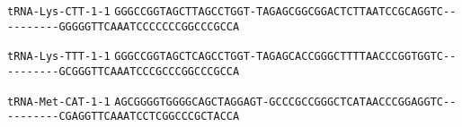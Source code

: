 \documentclass{article}
\newcommand{\rnabox}[1]{\colorbox{#1}{\texttt{#1}}}
\begin{document}
\vspace{-0.5mm}

\texttt{tRNA-Lys-CTT-1-1}
\rnabox{G}\rnabox{G}\rnabox{G}\rnabox{C}\rnabox{C}\rnabox{G}\rnabox{G}\rnabox{T}\rnabox{A}\rnabox{G}\rnabox{C}\rnabox{T}\rnabox{T}\rnabox{A}\rnabox{G}\rnabox{C}\rnabox{C}\rnabox{T}\rnabox{G}\rnabox{G}\rnabox{T}\rnabox{-}\rnabox{T}\rnabox{A}\rnabox{G}\rnabox{A}\rnabox{G}\rnabox{C}\rnabox{G}\rnabox{G}\rnabox{C}\rnabox{G}\rnabox{G}\rnabox{A}\rnabox{C}\rnabox{T}\rnabox{C}\rnabox{T}\rnabox{T}\rnabox{A}\rnabox{A}\rnabox{T}\rnabox{C}\rnabox{C}\rnabox{G}\rnabox{C}\rnabox{A}\rnabox{G}\rnabox{G}\rnabox{T}\rnabox{C}\rnabox{-}\rnabox{-}\rnabox{-}\rnabox{-}\rnabox{-}\rnabox{-}\rnabox{-}\rnabox{-}\rnabox{-}\rnabox{-}\rnabox{G}\rnabox{G}\rnabox{G}\rnabox{G}\rnabox{G}\rnabox{T}\rnabox{T}\rnabox{C}\rnabox{A}\rnabox{A}\rnabox{A}\rnabox{T}\rnabox{C}\rnabox{C}\rnabox{C}\rnabox{C}\rnabox{C}\rnabox{C}\rnabox{C}\rnabox{G}\rnabox{G}\rnabox{C}\rnabox{C}\rnabox{C}\rnabox{G}\rnabox{C}\rnabox{C}\rnabox{A}

\vspace{-0.5mm}

\texttt{tRNA-Lys-TTT-1-1}
\rnabox{G}\rnabox{G}\rnabox{G}\rnabox{C}\rnabox{C}\rnabox{G}\rnabox{G}\rnabox{T}\rnabox{A}\rnabox{G}\rnabox{C}\rnabox{T}\rnabox{C}\rnabox{A}\rnabox{G}\rnabox{C}\rnabox{C}\rnabox{T}\rnabox{G}\rnabox{G}\rnabox{T}\rnabox{-}\rnabox{T}\rnabox{A}\rnabox{G}\rnabox{A}\rnabox{G}\rnabox{C}\rnabox{A}\rnabox{C}\rnabox{C}\rnabox{G}\rnabox{G}\rnabox{G}\rnabox{C}\rnabox{T}\rnabox{T}\rnabox{T}\rnabox{T}\rnabox{A}\rnabox{A}\rnabox{C}\rnabox{C}\rnabox{C}\rnabox{G}\rnabox{G}\rnabox{T}\rnabox{G}\rnabox{G}\rnabox{T}\rnabox{C}\rnabox{-}\rnabox{-}\rnabox{-}\rnabox{-}\rnabox{-}\rnabox{-}\rnabox{-}\rnabox{-}\rnabox{-}\rnabox{-}\rnabox{G}\rnabox{C}\rnabox{G}\rnabox{G}\rnabox{G}\rnabox{T}\rnabox{T}\rnabox{C}\rnabox{A}\rnabox{A}\rnabox{A}\rnabox{T}\rnabox{C}\rnabox{C}\rnabox{C}\rnabox{G}\rnabox{C}\rnabox{C}\rnabox{C}\rnabox{G}\rnabox{G}\rnabox{C}\rnabox{C}\rnabox{C}\rnabox{G}\rnabox{C}\rnabox{C}\rnabox{A}

\vspace{-0.5mm}

\texttt{tRNA-Met-CAT-1-1}
\rnabox{A}\rnabox{G}\rnabox{C}\rnabox{G}\rnabox{G}\rnabox{G}\rnabox{G}\rnabox{T}\rnabox{G}\rnabox{G}\rnabox{G}\rnabox{G}\rnabox{C}\rnabox{A}\rnabox{G}\rnabox{C}\rnabox{T}\rnabox{A}\rnabox{G}\rnabox{G}\rnabox{A}\rnabox{G}\rnabox{T}\rnabox{-}\rnabox{G}\rnabox{C}\rnabox{C}\rnabox{C}\rnabox{G}\rnabox{C}\rnabox{C}\rnabox{G}\rnabox{G}\rnabox{G}\rnabox{C}\rnabox{T}\rnabox{C}\rnabox{A}\rnabox{T}\rnabox{A}\rnabox{A}\rnabox{C}\rnabox{C}\rnabox{C}\rnabox{G}\rnabox{G}\rnabox{A}\rnabox{G}\rnabox{G}\rnabox{T}\rnabox{C}\rnabox{-}\rnabox{-}\rnabox{-}\rnabox{-}\rnabox{-}\rnabox{-}\rnabox{-}\rnabox{-}\rnabox{-}\rnabox{-}\rnabox{C}\rnabox{G}\rnabox{A}\rnabox{G}\rnabox{G}\rnabox{T}\rnabox{T}\rnabox{C}\rnabox{A}\rnabox{A}\rnabox{A}\rnabox{T}\rnabox{C}\rnabox{C}\rnabox{T}\rnabox{C}\rnabox{G}\rnabox{G}\rnabox{C}\rnabox{C}\rnabox{C}\rnabox{G}\rnabox{C}\rnabox{T}\rnabox{A}\rnabox{C}\rnabox{C}\rnabox{A}
\end{document}
